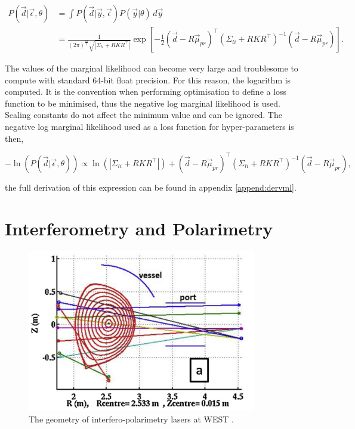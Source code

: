 \begin{equation}
\begin{aligned}
 P(\vec d|\vec\epsilon,\theta) &= \int P(\vec{d}|\vec{y},\vec\epsilon)P(\vec{y}|\theta)  \, d\vec y \\
 &= \frac{1}{(2\pi)^{\frac{m}{2}} \sqrt{|\Sigma_{li} + RKR^\top|}} \exp\left[ -\frac{1}{2} (\vec{d} - R\vec{\mu}_{pr})^{\top} (\Sigma_{li} + R K R^{\top})^{-1} (\vec{d} - R\vec{\mu}_{pr}) \right].
\end{aligned}
\end{equation}

\noindent The values of the marginal likelihood can become very large and troublesome to compute with standard 64-bit float precision. For this reason, the logarithm is computed. It is the convention when performing optimisation to define a loss function to be minimised, thus the negative log marginal likelihood is used. Scaling constants do not affect the minimum value and can be ignored. The negative log marginal likelihood used as a loss function for hyper-parameters is then,

\begin{equation}
-\ln(P(\vec d| \vec \epsilon,\theta)) \propto \ln(|\Sigma_{li}+RKR^\top|) +  (\vec{d} - R\vec{\mu}_{pr})^{\top} (\Sigma_{li} + R K R^{\top})^{-1} (\vec{d} - R\vec{\mu}_{pr}),
\end{equation}

\noindent the full derivation of this expression can be found in appendix \ref{append:dervml}.


\section{Interferometry and Polarimetry}

\begin{figure}[H]
  \centering
  \includegraphics[width=10cm]{images/interfgeo.png}
  \caption{The geometry of interfero-polarimetry lasers at WEST \cite{westinterfero}.}
  \label{fig:interfgeo}
\end{figure}

